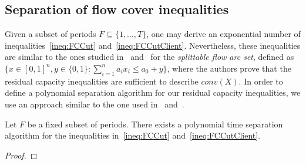 \subsection{Separation of flow cover inequalities}
Given a subset of periods $F\subseteq \{1,\ldots,T\}$, one may derive an exponential number of inequalities~\eqref{ineq:FCCut} and~\eqref{ineq:FCCutClient}.
Nevertheless, these inequalities are similar to the ones studied in~\cite{atamturk_splittable_2002} and~\cite{magnanti_convex_1993} for the {\em splittable flow arc set}, defined as $\{x\in[0,1]^n, y\in\{0,1\}:\sum_{i=1}^n a_i x_i\leq a_0+y\}$, where the authors prove that the residual capacity inequalities are sufficient to describe $conv(X)$. 
In order to define a polynomial separation algorithm for our residual capacity inequalities, we use an approach similar to the one used in~\cite{atamturk_splittable_2002} and~\cite{levi_approximation_2008}.

\begin{theorem}
    Let $F$ be a fixed subset of periods. There exists a polynomial time separation algorithm for the inequalities in~\eqref{ineq:FCCut} and~\eqref{ineq:FCCutClient}.
\end{theorem}
\begin{proof}
    
\end{proof}
